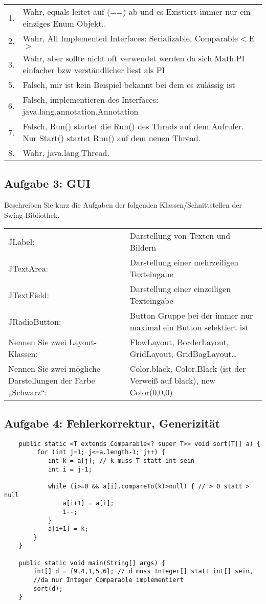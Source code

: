 \documentclass[a4paper, 10pt]{article}
\begin{document}
\begin{tabular}{lp{15cm}} 
1.& Wahr, equals leitet auf (==) ab und es Existiert immer nur ein einziges Enum Objekt..\\
2.& Wahr, All Implemented Interfaces: Serializable, Comparable$<$E$>$\\
3.& Wahr, aber sollte nicht oft verwendet werden da sich Math.PI einfacher bzw verständlicher liest als PI\\
5.& Falsch, mir ist kein Beispiel bekannt bei dem es zulässig ist\\
6.& Falsch, implementieren des Interfaces: java.lang.annotation.Annotation\\
7.& Falsch, Run() startet die Run() des Thrads auf dem Aufrufer. Nur Start() startet Run() auf dem neuen Thread.\\
8.& Wahr, java.lang.Thread.  
\end{tabular}

\subsection*{Aufgabe 3: GUI}
Beschreiben Sie kurz die Aufgaben der folgenden
Klassen/Schnittstellen der Swing-Bibliothek.\\

\begin{tabular}{p{5cm}p{15cm}}
JLabel: & Darstellung von Texten und Bildern \\
JTextArea: & Darstellung einer mehrzeiligen Texteingabe\\
JTextField: & Darstellung einer einzeiligen Texteingabe\\
JRadioButton: & Button Gruppe bei der immer nur maximal ein Button selektiert ist\\
Nennen Sie zwei Layout-Klassen: & FlowLayout, BorderLayout, GridLayout, GridBagLayout\ldots\\
Nennen Sie zwei mögliche Darstellungen der Farbe „Schwarz“: & Color.black, Color.Black (ist der Verweiß auf black), new Color(0,0,0)
\end{tabular}

\subsection*{Aufgabe 4: Fehlerkorrektur, Generizität}

\begin{lstlisting}
    public static <T extends Comparable<? super T>> void sort(T[] a) {
         for (int j=1; j<=a.length-1; j++) {
         	int k = a[j]; // k muss T statt int sein
         	int i = j-1;
         	
         	while (i>=0 && a[i].compareTo(k)>null) { // > 0 statt > null
         		a[i+1] = a[i];
         		i--;
         	}
         	a[i+1] = k;
        }
    }
    
    public static void main(String[] args) {
        int[] d = {9,4,1,5,6}; // d muss Integer[] statt int[] sein, 
        //da nur Integer Comparable implementiert
        sort(d);
    }
\end{lstlisting}
\end{document}
